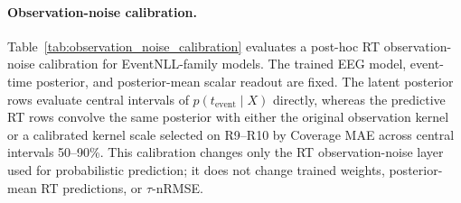 \documentclass[12pt]{article}
\begin{document}
\paragraph{Observation-noise calibration.}
Table~\ref{tab:observation_noise_calibration} evaluates a post-hoc RT observation-noise calibration for EventNLL-family models. The trained EEG model, event-time posterior, and posterior-mean scalar readout are fixed. The latent posterior rows evaluate central intervals of \(p(t_{\mathrm{event}}\mid X)\) directly, whereas the predictive RT rows convolve the same posterior with either the original observation kernel or a calibrated kernel scale selected on R9--R10 by Coverage MAE across central intervals 50--90\%. This calibration changes only the RT observation-noise layer used for probabilistic prediction; it does not change trained weights, posterior-mean RT predictions, or \(\tau\)-nRMSE.
\end{document}
